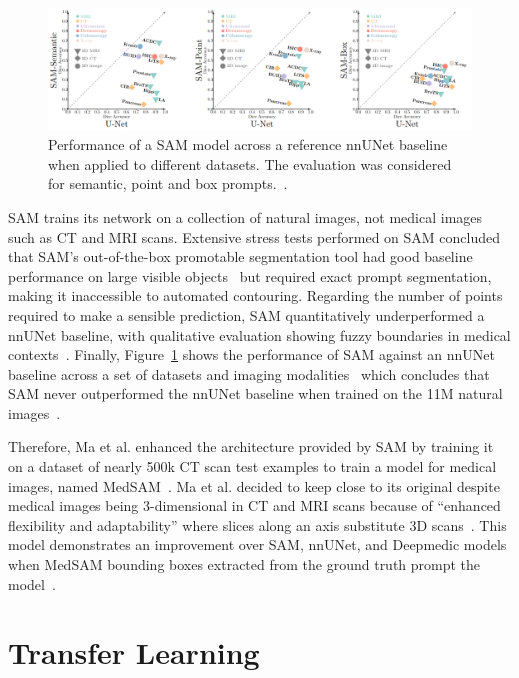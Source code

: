 \documentclass[11pt,twoside]{report}
\begin{document}
\begin{figure}[H]
  \centering
  \includegraphics[width=1\linewidth]{../figures/sam-performance.png}
  \caption{Performance of a SAM model across a reference nnUNet baseline when applied to different datasets. The evaluation was considered for semantic, point and box prompts.~\cite{he2023computervision}.}\label{fig:sam-performance}
\end{figure}

SAM trains its network on a collection of natural images, not medical images such as CT and MRI scans. Extensive stress tests performed on SAM concluded that SAM's out-of-the-box promotable segmentation tool had good baseline performance on large visible objects~\cite{deng2023segment} but required exact prompt segmentation, making it inaccessible to automated contouring. Regarding the number of points required to make a sensible prediction, SAM quantitatively underperformed a nnUNet baseline, with qualitative evaluation showing fuzzy boundaries in medical contexts~\cite{hu2023sam}. Finally, Figure~\ref{fig:sam-performance} shows the performance of SAM against an nnUNet baseline across a set of datasets and imaging modalities~\cite{he2023computervision} which concludes that SAM never outperformed the nnUNet baseline when trained on the 11M natural images~\cite{SAM}. 

Therefore, Ma et al. enhanced the architecture provided by SAM by training it on a dataset of nearly 500k CT scan test examples to train a model for medical images, named MedSAM~\cite{Ma2024}. Ma et al. decided to keep close to its original despite medical images being 3-dimensional in CT and MRI scans because of ``enhanced flexibility and adaptability'' where slices along an axis substitute 3D scans~\cite{Ma2024}. This model demonstrates an improvement over SAM, nnUNet, and Deepmedic models when MedSAM bounding boxes extracted from the ground truth prompt the model~\cite{Ma2024}.

\section{Transfer Learning}
\end{document}
